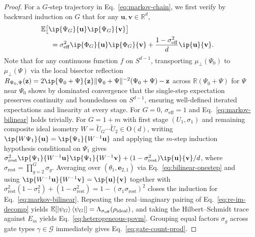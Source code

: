 \begin{proof}
For a $G$-step trajectory in Eq.~\eqref{eq:markov-chain}, we first verify by backward induction on $G$ that for any $\mathbf{u}, \mathbf{v} \in \mathbb{R}^d$,
\begin{align}
\MoveEqLeft[1.4] \E\bigl[\ip{\Psi_G}{\mathbf{u}}\ip{\Psi_G}{\mathbf{v}}\bigr] \nonumber \\
&= \sigma_{\mathrm{eff}}^2 \ip{\Phi_G}{\mathbf{u}}\ip{\Phi_G}{\mathbf{v}} + \frac{1 - \sigma_{\mathrm{eff}}^2}{d}\ip{\mathbf{u}}{\mathbf{v}}.
\label{eq:markov-bilinear}
\end{align}
Note that for any continuous function $f$ on $S^{d-1}$, transporting $\mu_\perp(\Psi_0)$ to $\mu_\perp(\Psi)$ via the local bisector reflection $R_{\Psi_0, \Psi}(\mathbf{z}) = 2\ip{\Psi_0 + \Psi}{\mathbf{z}}\norm{\Psi_0 + \Psi}^{-2}(\Psi_0 + \Psi) - \mathbf{z}$ across $\mathbb{R}(\Psi_0 + \Psi)$ for $\Psi$ near $\Psi_0$ shows by dominated convergence that the single-step expectation preserves continuity and boundedness on $S^{d-1}$, ensuring well-defined iterated expectations and linearity at every stage. For $G = 0$, $\sigma_{\mathrm{eff}} = 1$ and Eq.~\eqref{eq:markov-bilinear} holds trivially. For $G = 1 + m$ with first stage $(U_1, \sigma_1)$ and remaining composite ideal isometry $W = \widetilde{U}_G \cdots \widetilde{U}_2 \in \mathrm{O}(d)$, writing $\ip{W\Psi_1}{\mathbf{u}} = \ip{\Psi_1}{W^{-1}\mathbf{u}}$ and applying the $m$-step induction hypothesis conditional on $\Psi_1$ gives $\sigma_{\mathrm{rest}}^2 \ip{\Psi_1}{W^{-1}\mathbf{u}}\ip{\Psi_1}{W^{-1}\mathbf{v}} + (1 - \sigma_{\mathrm{rest}}^2)\ip{\mathbf{u}}{\mathbf{v}}/d$, where $\sigma_{\mathrm{rest}} = \prod_{g=2}^G \sigma_g$. Averaging over $(\theta_1, \mathbf{e}_{2,1})$ via Eq.~\eqref{eq:bilinear-onestep} and using $\ip{W^{-1}\mathbf{u}}{W^{-1}\mathbf{v}} = \ip{\mathbf{u}}{\mathbf{v}}$ together with $\sigma_{\mathrm{rest}}^2(1 - \sigma_1^2) + (1 - \sigma_{\mathrm{rest}}^2) = 1 - (\sigma_1\sigma_{\mathrm{rest}})^2$ closes the induction for Eq.~\eqref{eq:markov-bilinear}. Repeating the real--imaginary pairing of Eq.~\eqref{eq:re-im-decomp} yields $\mathbb{E}[\ket{\psi_G}\bra{\psi_G}] = \Lambda_{\sigma_{\mathrm{eff}}}(\rho_{\mathrm{ideal}})$, and taking the Hilbert--Schmidt trace against $E_m$ yields Eq.~\eqref{eq:heterogeneous-povm}. Grouping equal factors $\sigma_g$ across gate types $\gamma \in \mathcal{G}$ immediately gives Eq.~\eqref{eq:gate-count-prod}.
\end{proof}


